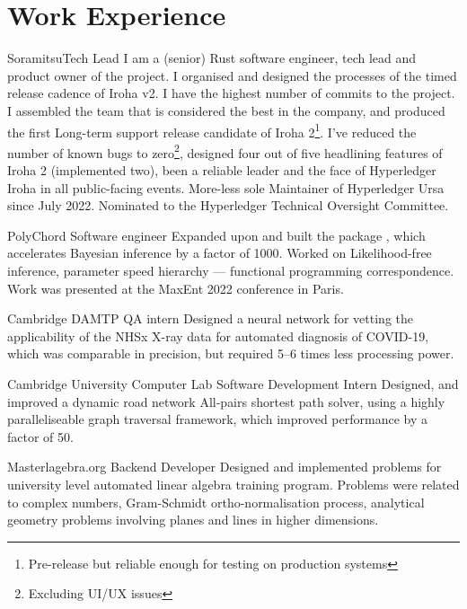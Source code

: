 \documentclass{CurriculumVitae}[10pt, condensed]
\begin{document}
\section*{Work Experience} {%
  \setlength{\parindent}{0in}%

   {Soramitsu}{Tech Lead} {I am a (senior) Rust
    software engineer, tech lead and product owner of the project.  I
    organised and designed the processes of the timed release cadence
    of Iroha v2. I have the highest number of commits to the project.
    I assembled the team that is considered the best in the company,
    and produced the first Long-term support release candidate of
    Iroha 2\footnote{Pre-release but reliable enough for testing on
      production systems}. I've reduced the number of known bugs to
    zero\footnote{Excluding UI/UX issues}, designed four out of five
    headlining features of Iroha 2 (implemented two), been a reliable
    leader and the face of Hyperledger Iroha in all public-facing
    events. More-less sole Maintainer of Hyperledger Ursa since July
    2022. Nominated to the Hyperledger Technical Oversight
    Committee. }

   {PolyChord} {Software
    engineer} { Expanded upon and built the package ,
    which accelerates Bayesian inference by a factor of 1000. Worked
    on Likelihood-free inference, parameter speed hierarchy ---
    functional programming correspondence. Work was presented at the
    MaxEnt 2022 conference in Paris.  }
  
   {Cambridge DAMTP} {QA intern} {Designed a
    neural network for vetting the applicability of the NHSx X-ray
    data for automated diagnosis of COVID-19, which was comparable in
    precision, but required 5--6 times less processing power.  }
  
   {Cambridge University Computer Lab}
  {Software Development Intern} {Designed, and improved a dynamic road
    network All-pairs shortest path solver, using a highly
    paralleliseable graph traversal framework, which improved
    performance by a factor of 50.  }
  
    {Masterlagebra.org} {Backend Developer}
  {Designed and implemented problems for university level automated
    linear algebra training program. Problems were related to complex
    numbers, Gram-Schmidt ortho-normalisation process, analytical geometry
    problems involving planes and lines in higher dimensions.
  }

}
\end{document}
